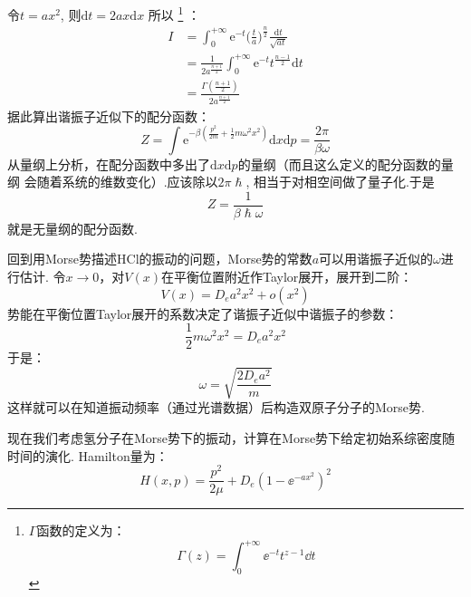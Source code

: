     令$t = ax^2$, 则$\mathrm{d}t = 2ax\mathrm{d}x$
    所以
    \footnote{$\Gamma$函数的定义为：
    \begin{equation}
        \Gamma(z) = \int_{0}^{+\infty}\ee^{-t}t^{z-1}\dd t
    \end{equation}
    }
    ：
    \begin{equation}
        \begin{split}
            I &= \int_0^{+\infty} \mathrm{e}^{-t} \bigg(\frac ta\bigg)^{\frac n2} \frac {\mathrm{d}t}{\sqrt{at}}\\
            &= \frac 1{2a^{\frac {n+1}2}} \int_0^{+\infty} \mathrm{e}^{-t} t^{\frac {n-1}2} \mathrm{d}t\\
            &= \frac {\Gamma(\frac {n+1}2)}{2a^{\frac {n+1}2}}
        \end{split}
    \end{equation}
    据此算出谐振子近似下的配分函数：
    \begin{equation}
        Z = \int \mathrm{e}^{-\beta (\frac {p^2}{2m} + \frac 12 m\omega^2 x^2)} \mathrm{d}x\mathrm{d}p = \frac {2\pi}{\beta \omega}
    \end{equation}
    从量纲上分析，在配分函数中多出了$\mathrm{d}x\mathrm{d}p$的量纲（而且这么定义的配分函数的量纲
    会随着系统的维数变化）.应该除以$2\pi\hslash$, 相当于对相空间做了量子化.于是
    \begin{equation}
        Z = \frac 1{\beta \hslash \omega}
    \end{equation}
    就是无量纲的配分函数.
    \par 
    回到用Morse势描述HCl的振动的问题，Morse势的常数$a$可以用谐振子近似的$\omega$进行估计.
    令$x \to 0 $，对$V(x)$在平衡位置附近作Taylor展开，展开到二阶：
    \begin{equation}
        V(x) = D_e a^2 x^2 + o(x^2)
    \end{equation}
    势能在平衡位置Taylor展开的系数决定了谐振子近似中谐振子的参数：
    \begin{equation}
        \frac 12 m\omega^2x^2 = D_e a^2 x^2
    \end{equation}
    于是：
    \begin{equation}
        \omega = \sqrt{\frac {2D_ea^2}m}
        \label{omega of Morse}
    \end{equation}
    这样就可以在知道振动频率（通过光谱数据）后构造双原子分子的Morse势.
    \par 
    现在我们考虑氢分子在Morse势下的振动，计算在Morse势下给定初始系综密度随时间的演化.
    Hamilton量为：
    \begin{equation}
        H(x, p) = \frac{p^2}{2\mu} + D_e(1-\ee^{-ax^2})^2
    \end{equation}
